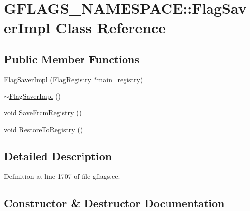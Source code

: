\hypertarget{classGFLAGS__NAMESPACE_1_1FlagSaverImpl}{}\section{G\+F\+L\+A\+G\+S\+\_\+\+N\+A\+M\+E\+S\+P\+A\+CE\+:\+:Flag\+Saver\+Impl Class Reference}
\label{classGFLAGS__NAMESPACE_1_1FlagSaverImpl}
\subsection*{Public Member Functions}
\begin{DoxyCompactItemize}
\item 
\hyperlink{classGFLAGS__NAMESPACE_1_1FlagSaverImpl_aea68c700bea03690d22019e00aa9c59a}{Flag\+Saver\+Impl} (Flag\+Registry $\ast$main\+\_\+registry)
\item 
\hyperlink{classGFLAGS__NAMESPACE_1_1FlagSaverImpl_a479a7316da81d6d3767b2940118071d8}{$\sim$\+Flag\+Saver\+Impl} ()
\item 
void \hyperlink{classGFLAGS__NAMESPACE_1_1FlagSaverImpl_a1837d4337e8093b087a862b2f7e55f1e}{Save\+From\+Registry} ()
\item 
void \hyperlink{classGFLAGS__NAMESPACE_1_1FlagSaverImpl_aff23b2a8c68020ee000c5083d4ed9c75}{Restore\+To\+Registry} ()
\end{DoxyCompactItemize}


\subsection{Detailed Description}


Definition at line 1707 of file gflags.\+cc.



\subsection{Constructor \& Destructor Documentation}
